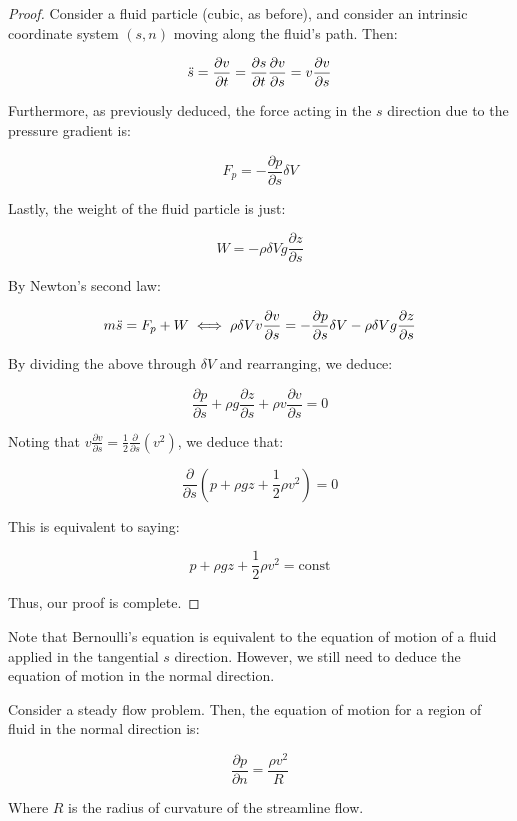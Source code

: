 \documentclass{article}
\begin{document}
\begin{proof}
    Consider a fluid particle (cubic, as before), and consider an intrinsic coordinate system $(s, n)$ moving along the fluid's path. Then:

    \[ \Ddot{s} = \frac{\partial v}{\partial t} = \frac{\partial s}{\partial t}\frac{\partial v}{\partial s} = v\frac{\partial v}{\partial s} \]

    Furthermore, as previously deduced, the force acting in the $s$ direction due to the pressure gradient is:

    \[ F_p = -\frac{\partial p}{\partial s}\delta V \]

    Lastly, the weight of the fluid particle is just:

    \[ W = -\rho \delta V g\frac{\partial z}{\partial s} \]

    By Newton's second law:

    \[ m\Ddot{s} = F_p + W \iff \rho \delta V v\frac{\partial v}{\partial s} = -\frac{\partial p}{\partial s}\delta V -\rho \delta V g\frac{\partial z}{\partial s} \]

    By dividing the above through $\delta V$ and rearranging, we deduce:

    \[ \frac{\partial p}{\partial s} + \rho g \frac{\partial z}{\partial s} + \rho v\frac{\partial v}{\partial s} = 0 \]

    Noting that $v\frac{\partial v}{\partial s} = \frac{1}{2} \frac{\partial }{\partial s}(v^2)$, we deduce that:

    \[ \frac{\partial}{\partial s}(p + \rho g z + \frac{1}{2}\rho v^2) = 0 \]

    This is equivalent to saying:

    \[ p + \rho g z + \frac{1}{2}\rho v^2 = \text{const} \]

    Thus, our proof is complete.
\end{proof}

Note that Bernoulli's equation is equivalent to the equation of motion of a fluid applied in the tangential $s$ direction. However, we still need to deduce the equation of motion in the normal direction.

\begin{proposition}
    Consider a steady flow problem. Then, the equation of motion for a region of fluid in the normal direction is:

    \[ \frac{\partial p}{\partial n} = \frac{\rho v^2}{R} \]

    Where $R$ is the radius of curvature of the streamline flow.
\end{proposition}
\end{document}
